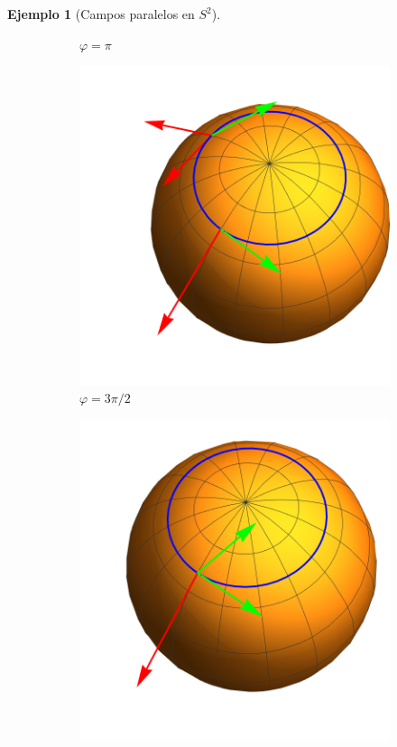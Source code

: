 \documentclass[spanish]{book}
\theoremstyle{definition}
\newtheorem*{ejem}{Ejemplo}
\begin{document}
\begin{ejem}[Campos paralelos en $S^2$]
\begin{figure}[H]
\begin{center}
\begin{subfigure}[t]{0.4\linewidth}
			\caption*{$\varphi=\pi$}
		\end{subfigure}
		\begin{subfigure}[t]{0.4\linewidth}
			\centering
			\includegraphics[width=\linewidth]{fig15e}
			\caption*{$\varphi=3\pi/2$}
		\end{subfigure}
		\begin{subfigure}[t]{0.4\linewidth}
			\centering
			\includegraphics[width=\linewidth]{fig15f}

\end{subfigure}
\end{center}
\end{figure}
\end{ejem}
\end{document}
